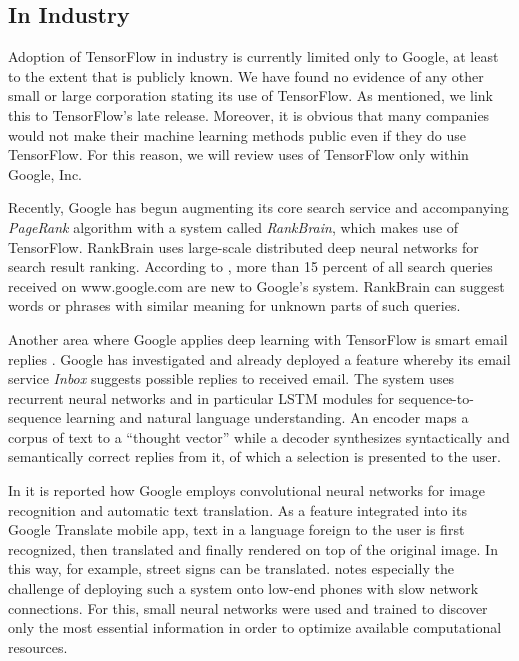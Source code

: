 \subsection{In Industry}\label{sec:uses-industry}

Adoption of TensorFlow in industry is currently limited only to Google, at least
to the extent that is publicly known. We have found no evidence of any other
small or large corporation stating its use of TensorFlow. As mentioned, we link
this to TensorFlow's late release. Moreover, it is obvious that many companies
would not make their machine learning methods public even if they do use
TensorFlow. For this reason, we will review uses of TensorFlow only within
Google, Inc.

Recently, Google has begun augmenting its core search service and accompanying
\emph{PageRank} algorithm\cite{pagerank} with a system called
\emph{RankBrain}\cite{rankbrain}, which makes use of TensorFlow. RankBrain uses
large-scale distributed deep neural networks for search result
ranking. According to \cite{rankbrain}, more than 15 percent of all search
queries received on www.google.com are new to Google's system. RankBrain can
suggest words or phrases with similar meaning for unknown parts of such queries.

Another area where Google applies deep learning with TensorFlow is smart email
replies \cite{emails}. Google has investigated and already deployed a feature
whereby its email service \emph{Inbox} suggests possible replies to received
email. The system uses recurrent neural networks and in particular LSTM modules
for sequence-to-sequence learning and natural language understanding. An encoder
maps a corpus of text to a ``thought vector'' while a decoder synthesizes
syntactically and semantically correct replies from it, of which a selection is
presented to the user.

In \cite{phones} it is reported how Google employs convolutional neural networks
for image recognition and automatic text translation. As a feature integrated
into its Google Translate mobile app, text in a language foreign to the user is
first recognized, then translated and finally rendered on top of the original
image. In this way, for example, street signs can be translated. \cite{phones}
notes especially the challenge of deploying such a system onto low-end phones
with slow network connections. For this, small neural networks were used and
trained to discover only the most essential information in order to optimize
available computational resources.


